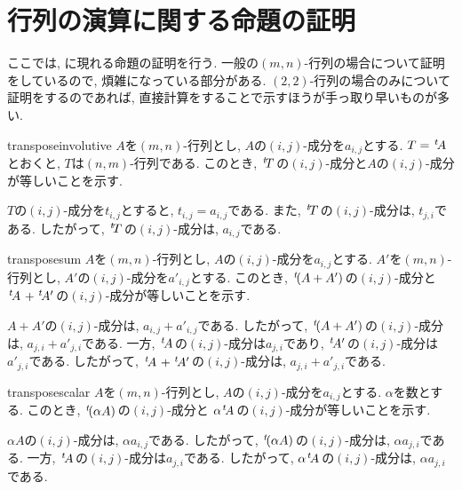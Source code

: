 \section{行列の演算に関する命題の証明}
ここでは, に現れる命題の証明を行う.
一般の$(m,n)$-行列の場合について証明をしているので,
煩雑になっている部分がある.
$(2,2)$-行列の場合のみについて証明をするのであれば,
直接計算をすることで示すほうが手っ取り早いものが多い.

\begin{proofof*}{transpose}{involutive}
  $A$を$(m,n)$-行列とし, 
  $A$の$(i,j)$-成分を$a_{i,j}$とする.
  $T={\left.^{t}\!A\right.}$とおくと,
  $T$は$(n,m)$-行列である.
  このとき, ${\left.^{t}\!T\right.}$の$(i,j)$-成分と$A$の$(i,j)$-成分が等しいことを示す.

  $T$の$(i,j)$-成分を$t_{i,j}$とすると,
  $t_{i,j}=a_{i,j}$である.
  また,
  ${\left.^{t}\!T\right.}$の$(i,j)$-成分は, $t_{j,i}$である.
  したがって, ${\left.^{t}\!T\right.}$の$(i,j)$-成分は, $a_{i,j}$である.
\end{proofof*}
\begin{proofof*}{transpose}{sum}
  $A$を$(m,n)$-行列とし, 
  $A$の$(i,j)$-成分を$a_{i,j}$とする.
  $A'$を$(m,n)$-行列とし, 
  $A'$の$(i,j)$-成分を$a'_{i,j}$とする.
  このとき, ${\left.^{t}\!(A+A')\right.}$の$(i,j)$-成分と
  ${\left.^{t}\!A\right.}+{\left.^{t}\!A'\right.}$の$(i,j)$-成分が等しいことを示す.

  $A+A'$の$(i,j)$-成分は, $a_{i,j}+a'_{i,j}$である.
  したがって,
  ${\left.^{t}\!(A+A')\right.}$の$(i,j)$-成分は, $a_{j,i}+a'_{j,i}$である.
  一方,
  ${\left.^{t}\!A\right.}$の$(i,j)$-成分は$a_{j,i}$であり,
  ${\left.^{t}\!A'\right.}$の$(i,j)$-成分は$a'_{j,i}$である.
  したがって,
  ${\left.^{t}\!A\right.}+{\left.^{t}\!A'\right.}$の$(i,j)$-成分は, $a_{j,i}+a'_{j,i}$である.
\end{proofof*}
\begin{proofof*}{transpose}{scalar}
  $A$を$(m,n)$-行列とし, 
  $A$の$(i,j)$-成分を$a_{i,j}$とする.
  $\alpha$を数とする.
  このとき, ${\left.^{t}\!(\alpha A)\right.}$の$(i,j)$-成分と
  $\alpha{\left.^{t}\!A\right.}$の$(i,j)$-成分が等しいことを示す.

  $\alpha A$の$(i,j)$-成分は, $\alpha a_{i,j}$である.
  したがって,
  ${\left.^{t}\!(\alpha A)\right.}$の$(i,j)$-成分は, $\alpha a_{j,i}$である.
  一方,
  ${\left.^{t}\!A\right.}$の$(i,j)$-成分は$a_{j,i}$である.
  したがって,
  $\alpha {\left.^{t}\!A\right.}$の$(i,j)$-成分は, $\alpha a_{j,i}$である.
\end{proofof*}

